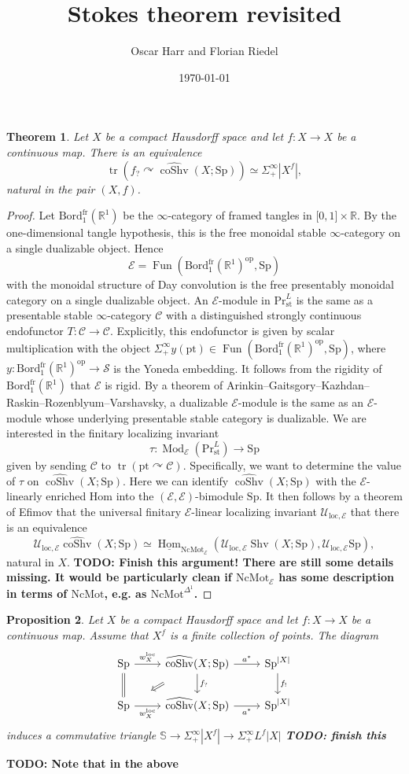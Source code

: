 \documentclass{amsart}
\title{Stokes theorem revisited}
\author{Oscar Harr and Florian Riedel}
\date{\today}
\numberwithin{equation}{section}
\newtheorem{thm}{Theorem}[section]
\newtheorem{prop}[thm]{Proposition}
\theoremstyle{definition}
\newcommand{\R}{\mathbb R}
\newcommand{\Pres}{\mathrm{Pr}_{\mathrm{st}}^{L}}
\newcommand{\NcMot}{\mathrm{NcMot}}
\newcommand{\Sp}{\mathrm{Sp}}
\newcommand{\frBord}[2]{\mathrm{Bord}_{#1}^{\mathrm{fr}}(\R^{#2})}
\newcommand{\modules}[1]{\operatorname{Mod}_{#1}}
\newcommand{\Fun}{\operatorname{Fun}}
\newcommand{\intHom}{\underline{\operatorname{Hom}}}
\newcommand{\term}{\mathrm{pt}}
\newcommand{\trace}{\operatorname{tr}}
\newcommand{\Shv}{\operatorname{Shv}}
\newcommand{\ccoShv}{\widehat{\operatorname{coShv}}}
\newcommand{\note}[1]{{\bf TODO: #1}}
\begin{document}
\begin{thm}
  Let $X$ be a compact Hausdorff space and let $f\colon X\to X$ be a continuous map. There is an equivalence
  $$
  \trace\left(
    f_?\curvearrowright\ccoShv (X;\Sp )
  \right)
  \simeq\Sigma^\infty_+|X^f|,
  $$
  natural in the pair $(X,f)$. 
\end{thm}
\begin{proof}
  Let $\frBord 1 1$ be the $\infty$-category of framed tangles in $\lbrack 0,1\rbrack\times\R$. By the one-dimensional tangle hypothesis, this is the free monoidal stable $\infty$-category on a single dualizable object. Hence
  $$
  \mathcal E = \Fun (\frBord 1 1^{\text{op}},\Sp )
  $$
  with the monoidal structure of Day convolution is the free presentably monoidal category on a single dualizable object. An $\mathcal E$-module in $\Pres$ is the same as a presentable stable $\infty$-category $\mathcal C$ with a distinguished strongly continuous endofunctor $T\colon\mathcal C\to\mathcal C$. Explicitly, this endofunctor is given by scalar multiplication with the object $\Sigma^\infty_+y(\term )\in\Fun (\frBord 1 1^{\text{op}},\Sp )$, where $y\colon\frBord 1 1^{\text{op}} \to\mathcal S$ is the Yoneda embedding. It follows from the rigidity of $\frBord 1 1$ that $\mathcal E$ is rigid. By a theorem of Arinkin--Gaitsgory--Kazhdan--Raskin--Rozenblyum--Varshavsky, a dualizable $\mathcal E$-module is the same as an $\mathcal E$-module whose underlying presentable stable category is dualizable. We are interested in the finitary localizing invariant
  $$
  \tau\colon\modules{\mathcal E}(\Pres )\to\Sp
  $$
  given by sending $\mathcal C$ to $\trace\left( \term\curvearrowright \mathcal C\right)$. Specifically, we want to determine the value of $\tau$ on $\ccoShv (X;\Sp )$. Here we can identify $\ccoShv (X;\Sp )$ with the $\mathcal E$-linearly enriched Hom into the $(\mathcal E,\mathcal E)$-bimodule $\Sp$. It then follows by a theorem of Efimov that the universal finitary $\mathcal E$-linear localizing invariant $\mathcal U_{\text{loc},\mathcal E}$ that there is an equivalence
  $$
  \mathcal U_{\text{loc},\mathcal E}\ccoShv(X;\Sp )
  \simeq\intHom_{\NcMot_{\mathcal E}}(\mathcal U_{\text{loc},\mathcal E}\Shv (X;\Sp ),\mathcal U_{\text{loc},\mathcal E}\Sp ),
  $$
  natural in $X$. \note{Finish this argument! There are still some details missing. It would be particularly clean if $\NcMot_{\mathcal E}$ has some description in terms of $\NcMot$, e.g. as $\NcMot^{\Delta^1}$.}
\end{proof}
\begin{prop}
  Let $X$ be a compact Hausdorff space and let $f\colon X\to X$ be a continuous map. Assume that $X^f$ is a finite collection of points. The diagram
  $$
  \begin{tikzcd}
    \Sp\arrow[r,"w^{\rm loc}_X"]\arrow[d,equal]
    &\ccoShv (X;\Sp )\arrow[r,"a^*"]\arrow[d,"f_?"]\arrow[dl,shorten >=4ex,shorten <=4ex,Rightarrow]
    & \Sp^{|X|}\arrow[d,"f_!"] \\
    \Sp\arrow[r,swap,"w^{\rm loc}_X"]
    &\ccoShv (X;\Sp )\arrow[r,swap,"a^*"]
    & \Sp^{|X|}
  \end{tikzcd}
  $$
  induces a commutative triangle $\mathbb S\to\Sigma^\infty_+ |X^f|\to\Sigma^\infty_+ L^f|X|$ \note{finish this}
\end{prop}
\note{Note that in the above }
\end{document}
